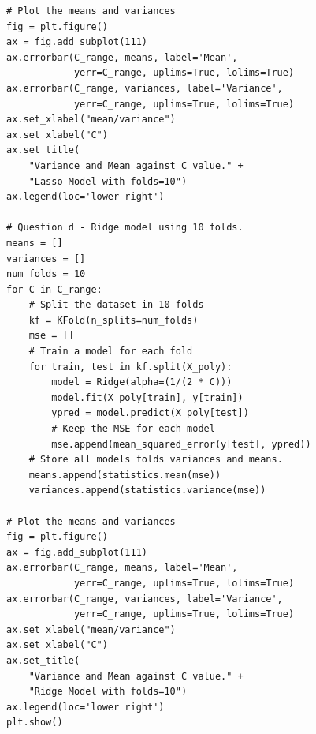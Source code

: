 \documentclass[10pt]{article}
\begin{document}
\begin{lstlisting}
# Plot the means and variances
fig = plt.figure()
ax = fig.add_subplot(111)
ax.errorbar(C_range, means, label='Mean',
            yerr=C_range, uplims=True, lolims=True)
ax.errorbar(C_range, variances, label='Variance',
            yerr=C_range, uplims=True, lolims=True)
ax.set_xlabel("mean/variance")
ax.set_xlabel("C")
ax.set_title(
    "Variance and Mean against C value." +
    "Lasso Model with folds=10")
ax.legend(loc='lower right')

# Question d - Ridge model using 10 folds.
means = []
variances = []
num_folds = 10
for C in C_range:
    # Split the dataset in 10 folds
    kf = KFold(n_splits=num_folds)
    mse = []
    # Train a model for each fold
    for train, test in kf.split(X_poly):
        model = Ridge(alpha=(1/(2 * C)))
        model.fit(X_poly[train], y[train])
        ypred = model.predict(X_poly[test])
        # Keep the MSE for each model
        mse.append(mean_squared_error(y[test], ypred))
    # Store all models folds variances and means.
    means.append(statistics.mean(mse))
    variances.append(statistics.variance(mse))

# Plot the means and variances
fig = plt.figure()
ax = fig.add_subplot(111)
ax.errorbar(C_range, means, label='Mean',
            yerr=C_range, uplims=True, lolims=True)
ax.errorbar(C_range, variances, label='Variance',
            yerr=C_range, uplims=True, lolims=True)
ax.set_xlabel("mean/variance")
ax.set_xlabel("C")
ax.set_title(
    "Variance and Mean against C value." +
    "Ridge Model with folds=10")
ax.legend(loc='lower right')
plt.show()
\end{lstlisting}
\end{document}
